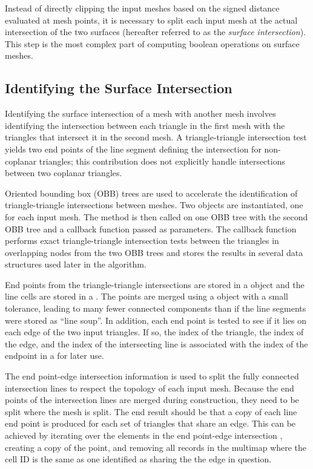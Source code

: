 \documentclass{InsightArticle}
\begin{document}
Instead of directly clipping the input meshes based on the signed distance evaluated at mesh points, it is necessary to split each input mesh at the actual intersection of the two surfaces (hereafter referred to as the \emph{surface intersection}). This step is the most complex part of computing boolean operations on surface meshes.

\subsection{Identifying the Surface Intersection}

Identifying the surface intersection of a mesh with another mesh involves identifying the intersection between each triangle in the first mesh with the triangles that intersect it in the second mesh. A triangle-triangle intersection test yields two end points of the line segment defining the intersection for non-coplanar triangles; this contribution does not explicitly handle intersections between two coplanar triangles. 

Oriented bounding box (OBB) trees are used to accelerate the identification of triangle-triangle intersections between meshes. Two  objects are instantiated, one for each input mesh. The method  is then called on one OBB tree with the second OBB tree and a callback function passed as parameters. The callback function performs exact triangle-triangle intersection tests between the triangles in overlapping nodes from the two OBB trees and stores the results in several data structures used later in the algorithm.

End points from the triangle-triangle intersections are stored in a  object and the line cells are stored in a . The points  are merged using a  object with a small tolerance, leading to many fewer connected components than if the line segments were stored as ``line soup''. In addition, each end point is tested to see if it lies on each edge of the two input triangles. If so, the index of the triangle, the index of the edge, and the index of the intersecting line is associated with the index of the endpoint in a  for later use.

The end point-edge intersection information is used to split the fully connected intersection lines to respect the topology of each input mesh. Because the end points of the intersection lines are merged during construction, they need to be split where the mesh is split. The end result should be that a copy of each line end point is produced for each set of triangles that share an edge. This can be achieved by iterating over the elements in the end point-edge intersection , creating a copy of the point, and removing all records in the multimap where the cell ID is the same as one identified as sharing the the edge in question.
\end{document}
